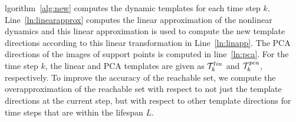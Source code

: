 lgorithm~\ref{alg:new} computes the dynamic templates for each time step $k$.
%
Line~\ref{ln:linearapprox} computes the linear approximation of the nonlinear dynamics and this linear approximation is used to compute the new template directions according to this linear transformation in Line~\ref{ln:linapp}.
%
The PCA directions of the images of support points is computed in line~\ref{ln:pca}.
%
For the time step $k$, the linear and PCA templates are given as $\mathcal{T}_{k}^{lin}$ and $\mathcal{T}_{k}^{pca}$, respectively.
%
To improve the accuracy of the reachable set, we compute the overapproximation of the reachable set with respect to not just the template directions at the current step, but with respect to other template directions for time steps that are within the lifespan $L$.
%
